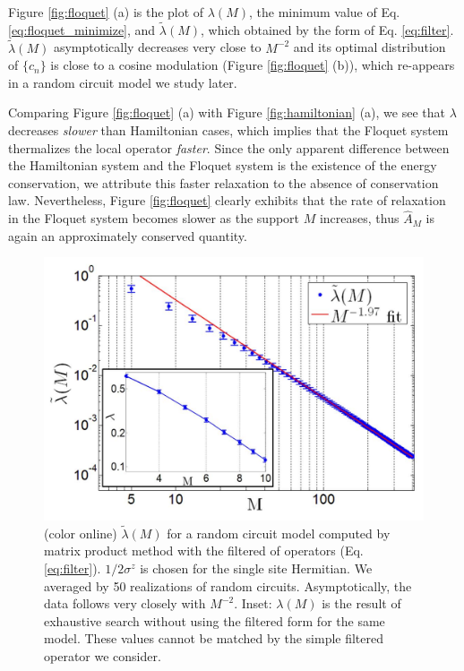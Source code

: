 \documentclass[twocolumn,superscriptaddress, prb]{revtex4-1}
\begin{document}
Figure \ref{fig:floquet} (a) is the plot of $\lambda (M)$, the minimum value of Eq. \ref{eq:floquet_minimize}, and
$\tilde{\lambda}(M)$, which obtained by the form of Eq. \eqref{eq:filter}.
$\tilde{\lambda}(M)$ asymptotically decreases very close to $M^{-2}$
and its optimal distribution of $\{ c_n\}$ is close to a cosine modulation (Figure \ref{fig:floquet} (b)),
which re-appears in a random circuit model we study later.





Comparing Figure \ref{fig:floquet} (a) with Figure \ref{fig:hamiltonian} (a),
we see that $\lambda$ decreases {\it slower} than Hamiltonian cases, which implies that the Floquet system thermalizes
the local operator {\it faster}. Since the only apparent difference between the Hamiltonian system and the Floquet system
is the existence of the energy conservation, we attribute this faster relaxation to the absence of conservation law.
Nevertheless, Figure \ref{fig:floquet} clearly exhibits that the rate of relaxation in the Floquet system
becomes slower as the support $M$ increases, thus $\hat{A}_M$ is again an approximately conserved quantity.


\begin{figure}
\includegraphics[width=1.0\linewidth]{fig_random_circuit.pdf}
\centering
\caption{ (color online)  $\tilde{\lambda}(M)$ for a random circuit model computed by matrix product method with the filtered of operators (Eq. \eqref{eq:filter}). $1/2\sigma^z$ is chosen for the single site Hermitian. We averaged by 50 realizations of random circuits. Asymptotically, the data follows very closely with $M^{-2}$.
Inset: $\lambda(M)$ is the result of exhaustive search without using the filtered form for the same model.
These values cannot be matched by the simple filtered operator we consider.}
\label{fig:random_circuit}
\end{figure}
\end{document}
